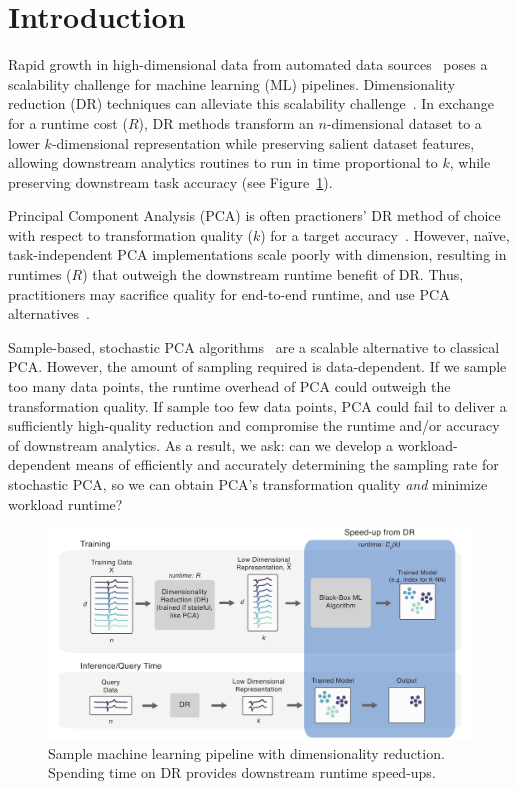 
\section{Introduction}
\label{sec:intro}

Rapid growth in high-dimensional data from automated data sources~\cite{plato,macrobase-cidr} poses a scalability challenge for machine learning (ML) pipelines.
Dimensionality reduction (DR) techniques can alleviate this scalability challenge~\cite{keogh-indexing,local-dr,decade,gemini}.
In exchange for a runtime cost ($R$), DR methods transform an $n$-dimensional dataset to a lower $k$-dimensional representation while preserving salient dataset features, allowing downstream analytics routines to run in time proportional to $k$, while preserving downstream task accuracy (see Figure~\ref{fig:pipeline}).

Principal Component Analysis (PCA) is often practioners' DR method of choice with respect to transformation quality ($k$) for a target accuracy~\cite{jolbook}. However, na\"{i}ve, task-independent PCA implementations scale poorly with dimension, resulting in runtimes ($R$) that outweigh the downstream runtime benefit of DR. Thus, practitioners may sacrifice quality for end-to-end runtime, and use PCA alternatives~\cite{keogh-study}. 

Sample-based, stochastic PCA algorithms~\cite{shamir,re-new} are a scalable alternative to classical PCA.
However, the amount of sampling required is data-dependent.
If we sample too many data points, the runtime overhead of PCA could outweigh the transformation quality.
If sample too few data points, PCA could fail to deliver a sufficiently high-quality reduction and compromise the runtime and/or accuracy of downstream analytics.
As a result, we ask: can we develop a workload-dependent means of efficiently and accurately determining the sampling rate for stochastic PCA, so we can obtain PCA's transformation quality \emph{and} minimize workload runtime?

\begin{figure}
\includegraphics[width=\linewidth]{figs/pipeline.pdf}
\caption[]{Sample machine learning pipeline with dimensionality reduction. Spending time on DR provides downstream runtime speed-ups.}
\label{fig:pipeline}
\end{figure}

